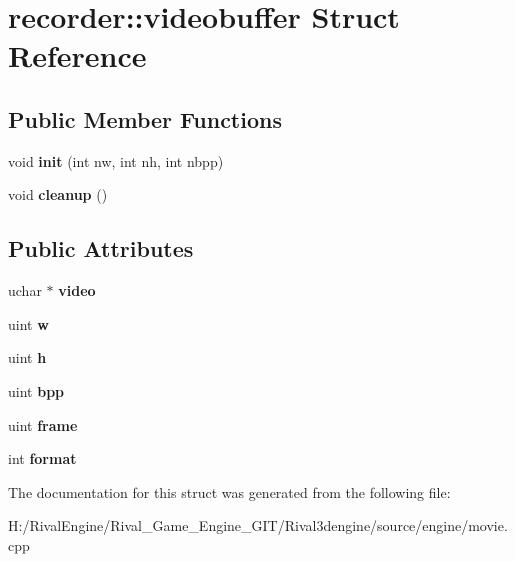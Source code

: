 \hypertarget{structrecorder_1_1videobuffer}{}\section{recorder\+:\+:videobuffer Struct Reference}
\label{structrecorder_1_1videobuffer}
\subsection*{Public Member Functions}
\begin{DoxyCompactItemize}
\item 
\mbox{\label{structrecorder_1_1videobuffer_af55f009fa8f3f6b0cb44fef932b27bd1}} 
void {\bfseries init} (int nw, int nh, int nbpp)
\item 
\mbox{\label{structrecorder_1_1videobuffer_a904087d8a5068e1212c120d40e8279ca}} 
void {\bfseries cleanup} ()
\end{DoxyCompactItemize}
\subsection*{Public Attributes}
\begin{DoxyCompactItemize}
\item 
\mbox{\label{structrecorder_1_1videobuffer_ab07b8c48ba4a7a2fc9ff59287cee848b}} 
uchar $\ast$ {\bfseries video}
\item 
\mbox{\label{structrecorder_1_1videobuffer_ad2aa23730487edaf16ef751f5af0cf46}} 
uint {\bfseries w}
\item 
\mbox{\label{structrecorder_1_1videobuffer_ab69d3cdcd32506e808e2e743ce149614}} 
uint {\bfseries h}
\item 
\mbox{\label{structrecorder_1_1videobuffer_ad05112a100d8df98a155d9a9b5812776}} 
uint {\bfseries bpp}
\item 
\mbox{\label{structrecorder_1_1videobuffer_a35e71996d0647f51a101ad67a6c6af7c}} 
uint {\bfseries frame}
\item 
\mbox{\label{structrecorder_1_1videobuffer_a1a51593f35c97208eddc1ee56b3d19a9}} 
int {\bfseries format}
\end{DoxyCompactItemize}


The documentation for this struct was generated from the following file\+:\begin{DoxyCompactItemize}
\item 
H\+:/\+Rival\+Engine/\+Rival\+\_\+\+Game\+\_\+\+Engine\+\_\+\+G\+I\+T/\+Rival3dengine/source/engine/movie.\+cpp\end{DoxyCompactItemize}
